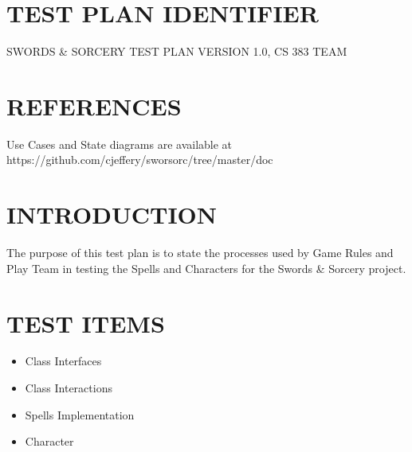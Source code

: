 \bigskip
\setcounter{page}{1}\pagestyle{Convertiv}

\section[IDENTIFIER]{\bfseries\color{black}
TEST PLAN IDENTIFIER}

{\color{black}
SWORDS \& SORCERY TEST PLAN VERSION 1.0, CS 383 TEAM



\section[REFERENCES]{\bfseries\color{black}
REFERENCES}

{\color{black}
Use Cases and State diagrams are available at https://github.com/cjeffery/sworsorc/tree/master/doc }



\section[INTRODUCTION]{\bfseries\color{black} INTRODUCTION}

{\color{black}

The purpose of this test plan is to state the processes used by Game Rules and Play Team in testing the Spells and Characters for the Swords \& Sorcery project.

}

\section[TEST ITEMS]{\bfseries\color{black} TEST ITEMS}


{\color{black}
\begin{itemize}
\item Class Interfaces
\item Class Interactions
\item Spells Implementation
\item Character 
\end{itemize}
}

}
